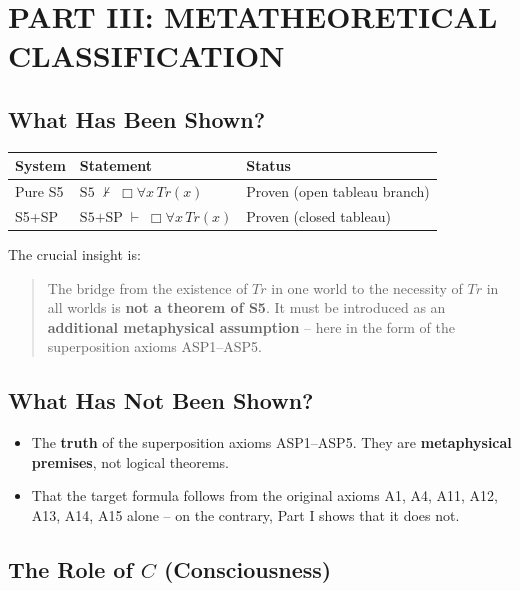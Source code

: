 \documentclass[
]{article}
\begin{document}
\section{PART III: METATHEORETICAL CLASSIFICATION}

\subsection{What Has Been Shown?}

\begin{table}[h]
\centering
\begin{tabular}{lll}
\toprule
\textbf{System} & \textbf{Statement} & \textbf{Status} \\
\midrule
Pure S5 & \(\text{S5} \;\not\vdash\; \Box\forall x\,Tr(x)\) & Proven (open tableau branch) \\
S5+SP & \(\text{S5+SP} \;\vdash\; \Box\forall x\,Tr(x)\) & Proven (closed tableau) \\
\bottomrule
\end{tabular}
\end{table}

The crucial insight is:

\begin{quote}
The bridge from the existence of \(Tr\) in one world to the necessity of \(Tr\) in all worlds is \textbf{not a theorem of S5}. It must be introduced as an \textbf{additional metaphysical assumption} – here in the form of the superposition axioms ASP1–ASP5.
\end{quote}

\subsection{What Has Not Been Shown?}

\begin{itemize}
\item The \textbf{truth} of the superposition axioms ASP1–ASP5. They are \textbf{metaphysical premises}, not logical theorems.
\item That the target formula follows from the original axioms A1, A4, A11, A12, A13, A14, A15 alone – on the contrary, Part I shows that it does not.
\end{itemize}

\subsection{The Role of \(C\) (Consciousness)}
\end{document}
